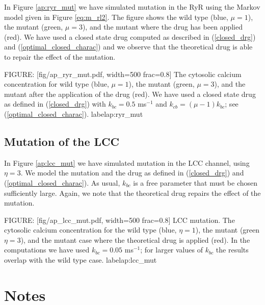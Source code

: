 In Figure \ref{ap:ryr_mut} we have simulated mutation in the RyR using the Markov model given in Figure \ref{eq:m_rl2}. The figure shows the
wild type (blue, $\mu=1$), the mutant (green, $\mu=3$), and the mutant where the drug has been applied (red). We have used a closed state drug  computed as described in (\ref{closed_drg}) and (\ref{optimal_closed_charac}) and we observe that the theoretical drug is able to repair the effect of the mutation.






FIGURE: [fig/ap_ryr_mut.pdf, width=500 frac=0.8] The cytosolic calcium concentration for wild type (blue, $\mu=1$), the mutant (green, $\mu=3$), and the mutant after the application of the drug (red). We have used a closed state drug  as defined in (\ref{closed_drg}) with $k_{bc}=0.5$ ms$^{-1}$ and $k_{cb}=(\mu-1)k_{bc}$; see (\ref{optimal_closed_charac}).  label{ap:ryr_mut}

\subsection{Mutation of the LCC}

In Figure \ref{ap:lcc_mut} we have simulated mutation in the LCC channel, using $\eta=3$.
We model the mutation and the drug as defined in (\ref{closed_drg}) and (\ref{optimal_closed_charac}). As usual, $k_{bc}$ is a free parameter that must be chosen sufficiently large. Again, we note that the theoretical drug repairs the effect of the mutation.

FIGURE: [fig/ap_lcc_mut.pdf, width=500 frac=0.8] LCC mutation. The cytosolic calcium concentration for the wild type (blue, $\eta=1$), the mutant (green $\eta=3$), and the mutant case where the theoretical drug is applied (red). In the computations we have used $k_{bc}=0.05$ ms$^{-1}$; for larger values of $k_{bc}$ the results overlap with the wild type case. label{ap:lcc_mut}


\section{Notes}

